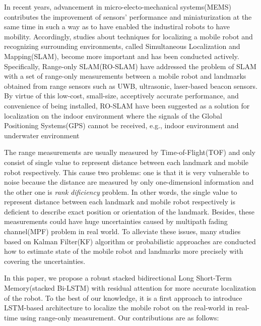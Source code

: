 \documentclass[letterpaper, 10 pt, conference]{ieeeconf}  %
\begin{document}
 In recent years, advancement in micro-electo-mechanical systems(MEMS) contributes the improvement of sensors' performance and miniaturization at the same time in such a way as to have enabled the industiral robots to have mobility. Accordingly, studies about techniques for localizing a mobile robot and recognizing surrounding environments, called Simultaneous Localization and Mapping(SLAM)\cite{dissanayake2001solution}, become more important and has been conducted actively. Specifically, Range-only SLAM(RO-SLAM) have addressed the problem of SLAM with a set of range-only measurements between a mobile robot and landmarks obtained from range sensors such as UWB, ultrasonic, laser-based beacon sensors. By virtue of this low-cost, small-size, acceptively accurate performance, and convenience of being installed, RO-SLAM have been suggested as a solution for localization on the indoor environment\cite{peneda2009trilateration, jung2011indoor} where the signals of the Global Positioning Systems(GPS) cannot be received, e.g., indoor environment\cite{peneda2009trilateration, jung2011indoor,raghavan2010accurate} and underwater environment\cite{newman2003pure, olson2006robust}
 
 
 The range measurements are usually measured by Time-of-Flight(TOF) and only consist of single value to represent distance between each landmark and mobile robot respectively. This cause two problems: one is that it is very vulnerable to noise because the distance are measured by only one-dimensionl information and the other one is \textit{rank dificiency} problem\cite{fabresse2018efficient}. In other words, the single value to represent distance between each landmark and mobile robot respectively is deficient to describe exact position or orientation of the landmark. Besides, these measurements could have huge uncertainties caused by multipath fading channel(MPF) problem\cite{li2017novel} in real world. To alleviate these issues, many studies based on Kalman Filter(KF) algorithm or probabilistic approaches are conducted how to estimate state of the mobile robot and landmarks more precisely with covering the uncertainties. 


In this paper, we propose a robust stacked bidirectional Long Short-Term Memory(stacked Bi-LSTM) with residual attention for more accurate localization of the robot. To the best of our knowledge, it is a first approach to introduce LSTM-based architecture to localize the mobile robot on the real-world in real-time using range-only measurement. Our contributions are as follows:
\end{document}
